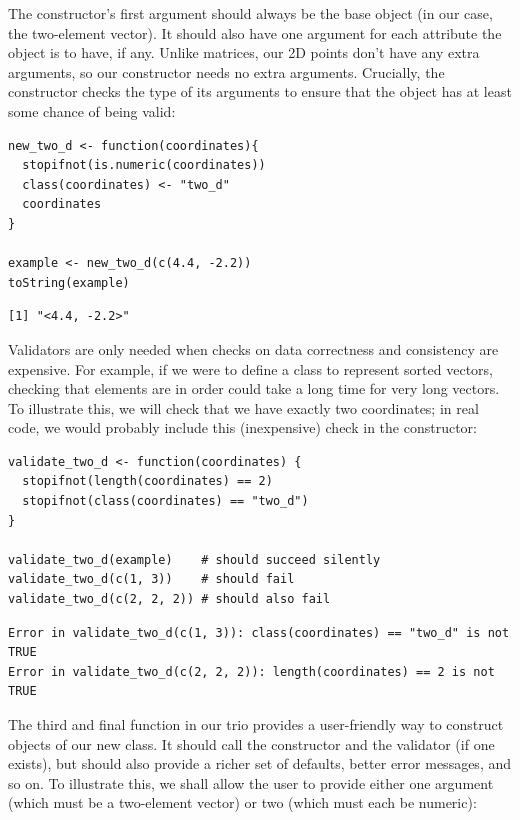 The constructor's first argument should always be the base object (in our case, the two-element vector).
It should also have one argument for each attribute the object is to have, if any.
Unlike matrices, our 2D points don't have any extra arguments, so our constructor needs no extra arguments.
Crucially,
the constructor checks the type of its arguments to ensure that the object has at least some chance of being valid:

\begin{lstlisting}
new_two_d <- function(coordinates){
  stopifnot(is.numeric(coordinates))
  class(coordinates) <- "two_d"
  coordinates
}

example <- new_two_d(c(4.4, -2.2))
toString(example)
\end{lstlisting}

\begin{lstlisting}
[1] "<4.4, -2.2>"
\end{lstlisting}

Validators are only needed when checks on data correctness and consistency are expensive.
For example,
if we were to define a class to represent sorted vectors,
checking that elements are in order could take a long time for very long vectors.
To illustrate this,
we will check that we have exactly two coordinates;
in real code,
we would probably include this (inexpensive) check in the constructor:

\begin{lstlisting}
validate_two_d <- function(coordinates) {
  stopifnot(length(coordinates) == 2)
  stopifnot(class(coordinates) == "two_d")
}

validate_two_d(example)    # should succeed silently
validate_two_d(c(1, 3))    # should fail
validate_two_d(c(2, 2, 2)) # should also fail
\end{lstlisting}

\begin{lstlisting}
Error in validate_two_d(c(1, 3)): class(coordinates) == "two_d" is not TRUE
Error in validate_two_d(c(2, 2, 2)): length(coordinates) == 2 is not TRUE
\end{lstlisting}

The third and final function in our trio
provides a user-friendly way to construct objects of our new class.
It should call the constructor and the validator (if one exists),
but should also provide a richer set of defaults,
better error messages,
and so on.
To illustrate this,
we shall allow the user to provide either one argument (which must be a two-element vector)
or two (which must each be numeric):

